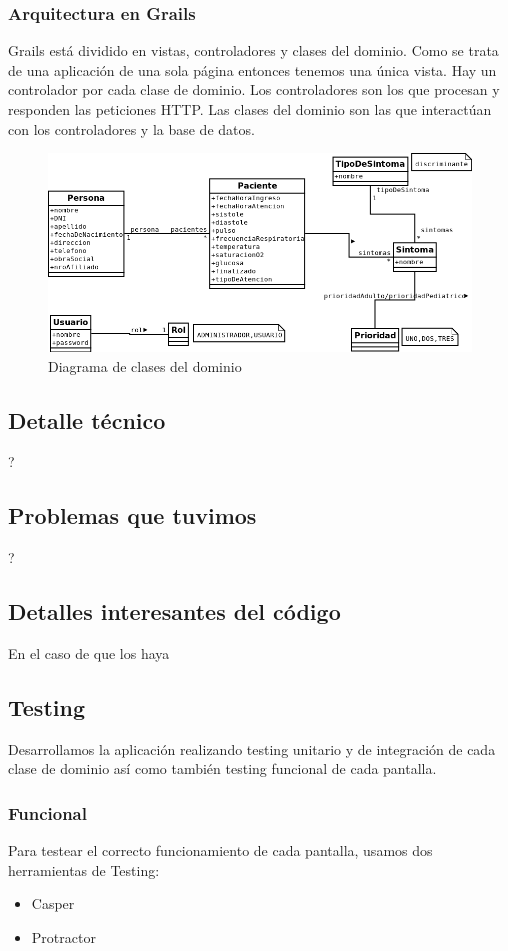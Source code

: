 \subsubsection{Arquitectura en Grails}
Grails está dividido en vistas, controladores y clases del dominio. Como se trata de una aplicación de una sola página entonces tenemos una única vista. Hay un controlador por cada clase de dominio. Los controladores son los que procesan y responden las peticiones HTTP. Las clases del dominio son las que interactúan con los controladores y la base de datos.
\begin{figure}[h]
\centering
\includegraphics[width=1.2\textwidth]{triage.png}
\caption{Diagrama de clases del dominio}
\end{figure}


\subsection{Detalle técnico}
?

\subsection{Problemas que tuvimos}
?

\subsection{Detalles interesantes del código}
En el caso de que los haya 




\subsection{Testing}
Desarrollamos la aplicación realizando testing unitario y de integración de cada clase de dominio así como también testing funcional de cada pantalla.
\subsubsection{Funcional}
Para testear el correcto funcionamiento de cada pantalla, usamos dos herramientas de Testing:
\begin{itemize}
\item Casper
\item Protractor
\end{itemize}


